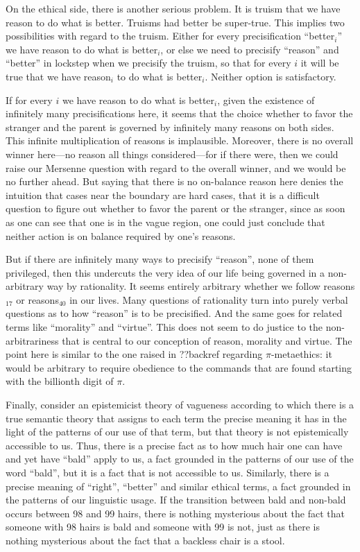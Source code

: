 On the ethical side, there is another serious problem. 
It is truism that we have reason to do what is better. Truisms had better be super-true. 
This implies two possibilities with regard to the truism.
Either for every precisification ``better$_i$'' we have reason to do what is better$_i$, or else we need to precisify ``reason'' and ``better'' in lockstep
when we precisify the truism, so that for every $i$ it will be true that we have reason$_i$ to do what is better$_i$. Neither option is satisfactory.

If for every $i$ we have reason to do what is better$_i$, given the existence of infinitely many precisifications here, it seems that the choice whether to
favor the stranger and the parent is governed by infinitely many reasons on both sides. This infinite multiplication of reasons is implausible. Moreover, there is no overall winner here---no reason all things considered---for if
there were, then we could raise our Mersenne question with regard to the overall winner, and we would be no further ahead. But saying that there is no on-balance reason
here denies the intuition that cases near the boundary are hard cases, that it is a difficult question to figure out whether to favor the parent or the stranger, since
as soon as one can see that one is in the vague region, one could just conclude that neither action is on balance required by one's reasons. 

But if there are infinitely many ways to precisify ``reason'', none of them privileged, then this undercuts the very idea of our life being governed in
a non-arbitrary way by rationality. It seems entirely arbitrary whether we follow reasons$_{17}$ or reasons$_{40}$ in our lives. Many questions of rationality
turn into purely verbal questions as to how ``reason'' is to be precisified. And the same goes for related terms like ``morality'' and ``virtue''. This 
does not seem to do justice to the non-arbitrariness that is central to our conception of reason, morality and virtue. The point here is similar to the
one raised in ??backref regarding $\pi$-metaethics: it would be arbitrary to require obedience to the commands that are found starting with the billionth digit of $\pi$.

Finally, consider an epistemicist theory of vagueness according to which there is a true semantic theory that assigns to each term the precise meaning it has in the
light of the patterns of our use of that term, but that theory is not epistemically accessible to us. Thus, there is a precise fact as to how much hair one can have
and yet have ``bald'' apply to us, a fact grounded in the patterns of our use of the word ``bald'', but it is a fact that is not accessible to us. Similarly, there is
a precise meaning of ``right'', ``better'' and similar ethical terms, a fact grounded in the patterns of our linguistic usage. If the transition between bald and non-bald occurs
between 98 and 99 hairs, there is nothing mysterious about the fact that someone with 98 hairs is bald and someone with 99 is not, just as there is nothing mysterious
about the fact that a backless chair is a stool. 

